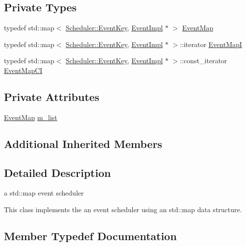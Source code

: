 \subsection*{Private Types}
\begin{DoxyCompactItemize}
\item 
typedef std\+::map$<$ \hyperlink{structns3_1_1Scheduler_1_1EventKey}{Scheduler\+::\+Event\+Key}, \hyperlink{classns3_1_1EventImpl}{Event\+Impl} $\ast$ $>$ \hyperlink{classns3_1_1MapScheduler_a10af9a8b8b476ca1f5b5f77fd5205947}{Event\+Map}
\item 
typedef std\+::map$<$ \hyperlink{structns3_1_1Scheduler_1_1EventKey}{Scheduler\+::\+Event\+Key}, \hyperlink{classns3_1_1EventImpl}{Event\+Impl} $\ast$ $>$\+::iterator \hyperlink{classns3_1_1MapScheduler_a2a8e917932af199ee16f16ddfcfac9f0}{Event\+MapI}
\item 
typedef std\+::map$<$ \hyperlink{structns3_1_1Scheduler_1_1EventKey}{Scheduler\+::\+Event\+Key}, \hyperlink{classns3_1_1EventImpl}{Event\+Impl} $\ast$ $>$\+::const\+\_\+iterator \hyperlink{classns3_1_1MapScheduler_a3b09cafd9c2c9f9010510ed20af54aeb}{Event\+Map\+CI}
\end{DoxyCompactItemize}
\subsection*{Private Attributes}
\begin{DoxyCompactItemize}
\item 
\hyperlink{classns3_1_1MapScheduler_a10af9a8b8b476ca1f5b5f77fd5205947}{Event\+Map} \hyperlink{classns3_1_1MapScheduler_ab92a615518fcb443aa2453c3a56f4ce2}{m\+\_\+list}
\end{DoxyCompactItemize}
\subsection*{Additional Inherited Members}


\subsection{Detailed Description}
a std\+::map event scheduler 

This class implements the an event scheduler using an std\+::map data structure. 

\subsection{Member Typedef Documentation}
